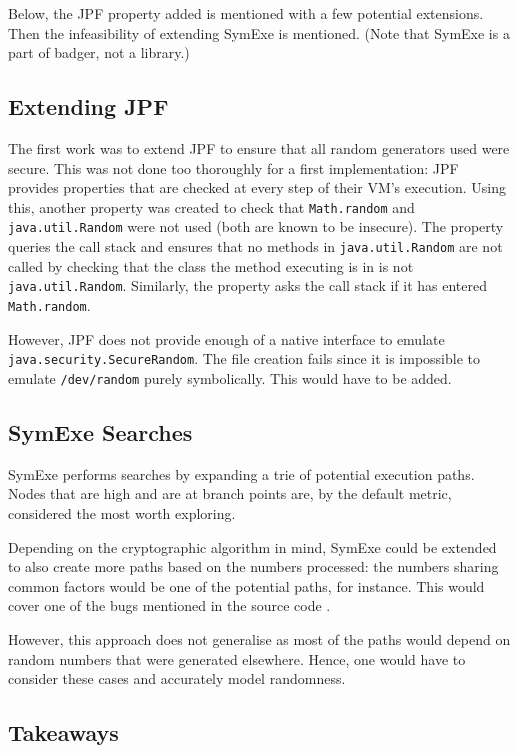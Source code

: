 \documentclass[letterpaper,twocolumn,10pt]{article}
\begin{document}
Below, the JPF property added is mentioned with a few potential extensions. Then the infeasibility of extending
SymExe is mentioned. (Note that SymExe is a part of badger, not a library.)

\subsection{Extending JPF}

The first work was to extend JPF to ensure that all random generators used were secure. This was not done too
thoroughly for a first implementation: JPF provides properties that are checked at every step of their VM's execution.
Using this, another property was created to check that \texttt{Math.random} and \texttt{java.util.Random} were not
used (both are known to be insecure). The property queries the call stack and ensures that no
methods in \texttt{java.util.Random} are not called by checking that the class the method executing is in is not \texttt{java.util.Random}.
Similarly, the property asks the call stack if it has entered \texttt{Math.random}.

However, JPF does not provide enough of a native interface to emulate \texttt{java.security.SecureRandom}. The
file creation fails since it is impossible to emulate \texttt{/dev/random} purely symbolically. This would have to
be added.

\subsection{SymExe Searches}

SymExe performs searches by expanding a trie of potential execution paths. Nodes that are high and are at branch points
are, by the default metric, considered the most worth exploring.

Depending on the cryptographic algorithm in mind, SymExe could be extended to also create more paths based on the numbers
processed: the numbers sharing common factors would be one of the potential paths, for instance. This would cover one of the
bugs mentioned in the source code \cite{RSAImpl}.

However, this approach does not generalise as most of the paths would depend on random numbers that were generated elsewhere.
Hence, one would have to consider these cases and accurately model randomness.

\subsection{Takeaways}
\end{document}
